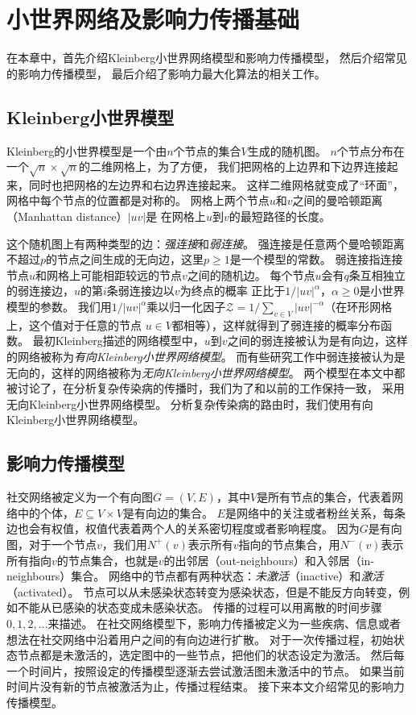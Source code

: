 
\chapter{小世界网络及影响力传播基础}
在本章中，首先介绍Kleinberg小世界网络模型和影响力传播模型，
然后介绍常见的影响力传播模型，
最后介绍了影响力最大化算法的相关工作。

\section{Kleinberg小世界模型}\label{sec:kleinberg}
Kleinberg的小世界模型是一个由$n$个节点的集合$V$生成的随机图。
$n$个节点分布在一个$\sqrt{n} \times \sqrt{n}$的二维网格上\cite{Kleinberg2000small}，为了方便，
我们把网格的上边界和下边界连接起来，同时也把网格的左边界和右边界连接起来。
这样二维网格就变成了“环面”，网格中每个节点的位置都是对称的。
网格上两个节点$u$和$v$之间的曼哈顿距离（Manhattan distance）$|uv|$是
在网格上$u$到$v$的最短路径的长度。

这个随机图上有两种类型的边：{\it 强连接}和{\it 弱连接}。
强连接是任意两个曼哈顿距离不超过$p$的节点之间生成的无向边，这里$p \geq 1$是一个模型的常数。
弱连接指连接节点$u$和网格上可能相距较远的节点$v$之间的随机边。
每个节点$u$会有$q$条互相独立的弱连接边，$u$的第$i$条弱连接边以$v$为终点的概率
正比于$1/{|uv|}^\alpha$，$\alpha\geq 0$是小世界模型的参数。
我们用$1/{|uv|}^\alpha$乘以归一化因子$\mathcal{Z} = 1/\sum_{v\in V}|uv|^{-\alpha}$（在环形网格上，这个值对于任意的节点 $u\in V$都相等），这样就得到了弱连接的概率分布函数。
最初Kleinberg描述的网络模型\cite{Kleinberg2000small}中，$u$到$v$之间的弱连接被认为是有向边，这样的网络被称为{\it 有向Kleinberg小世界网络模型}。
而有些研究工作\cite{Ghasemiesfeh2013complex}中弱连接被认为是无向的，这样的网络被称为{\it 无向Kleinberg小世界网络模型}。
两个模型在本文中都被讨论了，在分析复杂传染病的传播时，我们为了和以前的工作保持一致，
采用无向Kleinberg小世界网络模型。
分析复杂传染病的路由时，我们使用有向Kleinberg小世界网络模型。

\section{影响力传播模型}
社交网络被定义为一个有向图$G=(V,E)$，其中$V$是所有节点的集合，代表着网络中的个体，$E\subseteq V \times V$是有向边的集合。
$E$是网络中的关注或者粉丝关系，每条边也会有权值，权值代表着两个人的关系密切程度或者影响程度。
因为$G$是有向图，对于一个节点$v$，我们用$N^+(v)$表示所有$v$指向的节点集合，用$N^-(v)$表示所有指向$v$的节点集合，也就是$v$的出邻居（out-neighbours）和入邻居（in-neighbours）集合。
网络中的节点都有两种状态：{\it 未激活}（inactive）和{\it 激活}（activated）。
节点可以从未感染状态转变为感染状态，但是不能反方向转变，例如不能从已感染的状态变成未感染状态。
传播的过程可以用离散的时间步骤$0,1,2,\ldots$来描述。
在社交网络模型下，影响力传播被定义为一些疾病、信息或者想法在社交网络中沿着用户之间的有向边进行扩散。
对于一次传播过程，初始状态节点都是未激活的，选定图中的一些节点，把他们的状态设定为激活。
然后每一个时间片，按照设定的传播模型逐渐去尝试激活图未激活中的节点。
如果当前时间片没有新的节点被激活为止，传播过程结束。
接下来本文介绍常见的影响力传播模型。


